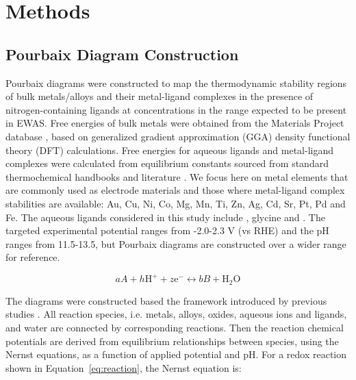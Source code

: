\documentclass[journal=jacsat,manuscript=article]{achemso}
\begin{document}
\section{Methods}
\subsection{Pourbaix Diagram Construction}
Pourbaix diagrams were constructed to map the thermodynamic stability regions of bulk metals/alloys and their metal-ligand complexes in the presence of nitrogen-containing ligands at concentrations in the range expected to be present in EWAS.
Free energies of bulk metals were obtained from the Materials Project database \cite{Jain2013TheInnovation}, based on generalized gradient approximation (GGA) density functional theory (DFT) calculations. Free energies for aqueous ligands and metal-ligand complexes were calculated from equilibrium constants sourced from standard thermochemical handbooks \cite{Wagman1982TheUnits, Smith1989CriticalConstants, Bard2017StandardSolution, Bjerrum1957StabilitySubstances} and literature \cite{Meng1996PrinciplesReview, Azadi2019DataComplexes, Aviles2022ExploringNH3, Oraby2023SelectiveSolutions, Harrington2005DeterminationIon}. We focus here on metal elements that are commonly used as electrode materials and those where metal-ligand complex stabilities are available: Au, Cu, Ni, Co, Mg, Mn, Ti, Zn, Ag, Cd, Sr, Pt, Pd and Fe. The aqueous ligands considered in this study include , glycine and . The targeted experimental potential ranges from -2.0-2.3 V (vs RHE) and the pH ranges from 11.5-13.5, but Pourbaix diagrams are constructed over a wider range for reference.

\begin{equation} \label{eq:reaction}
aA + h\text{H}^+ + z\text{e}^- \leftrightarrow bB + \text{H}_2\text{O}
\end{equation}

The diagrams were constructed based the framework introduced by previous studies \cite{PourbaixAtlasSolutions, Huang2017ImprovedCompounds,Huang2015ElectrochemicalCalculations,Singh2017ElectrochemicalMaterials,Patel2019EfficientCompounds,Persson2012PredictionStates, Ding2018ElectrochemicalStates, Thompson2011PourbaixSystems}. All reaction species, i.e. metals, alloys, oxides, aqueous ions and ligands, and water are connected by corresponding reactions. Then the reaction chemical potentials are derived from equilibrium relationships between species, using the Nernst equations, as a function of applied potential and pH. For a redox reaction shown in Equation~\eqref{eq:reaction}, the Nernst equation is:
\end{document}
